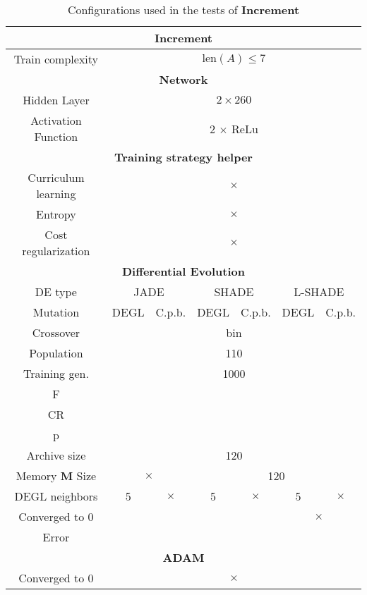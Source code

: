 \begin{table}[!h]
	\centering
	\begin{tabular}{|c|c|c|c|c|c|c|}
		\hline
		\multicolumn{7}{|c|}{\textbf{Increment}} \\ \hline
		Train complexity & \multicolumn{6}{c|}{$\textrm{len}(A) \leq 7$} \\ \hline \hline \hline
		\multicolumn{7}{|c|}{\textbf{Network}} \\ \hline
		Hidden Layer & \multicolumn{6}{c|}{$2 \times 260$}\\ \hline
		Activation Function & \multicolumn{6}{c|}{2 $\times$ ReLu}\\ \hline \hline

		\multicolumn{7}{|c|}{\textbf{Training strategy helper}} \\ \hline
		Curriculum learning & \multicolumn{6}{c|}{$\times$}\\ \hline
		Entropy & \multicolumn{6}{c|}{$\times$}\\ \hline
		Cost regularization & \multicolumn{6}{c|}{$\times$}\\ \hline \hline		
		
		\multicolumn{7}{|c|}{\textbf{Differential Evolution}} \\ \hline
		DE type & \multicolumn{2}{c|}{JADE} & \multicolumn{2}{c|}{SHADE} & \multicolumn{2}{c|}{L-SHADE}  \\ \hline
		Mutation & DEGL & C.p.b. & DEGL & C.p.b. & DEGL & C.p.b. \\ \hline
		Crossover & \multicolumn{6}{c|}{bin} \\ \hline
		Population & \multicolumn{6}{c|}{110} \\ \hline
		Training gen. & \multicolumn{6}{c|}{1000} \\ \hline
		F & & & & & &\\ \hline
		CR & & & & & &\\ \hline
		p & & & & & & \\ \hline
		Archive size & \multicolumn{6}{c|}{120} \\ \hline
		Memory \textbf{M} Size & \multicolumn{2}{c|}{$\times$} & \multicolumn{4}{|c|}{120} \\ \hline
		DEGL neighbors & 5 & $\times$ & 5 & $\times$ & 5 & $\times$  \\ \hline
		Converged to 0 & \multicolumn{4}{|c|}{\checkmark} & \multicolumn{2}{c|}{$\times$} \\ \hline
		Error & & & & & & \\ \hline\hline
		
		\multicolumn{7}{|c|}{\textbf{ADAM}} \\ \hline
		Converged to 0 & \multicolumn{6}{|c|}{$\times$} \\ \hline
 	\end{tabular}
	\caption{Configurations used in the tests of \textbf{Increment}}
	\label{tbl:tests-configurations-increment}
\end{table}

